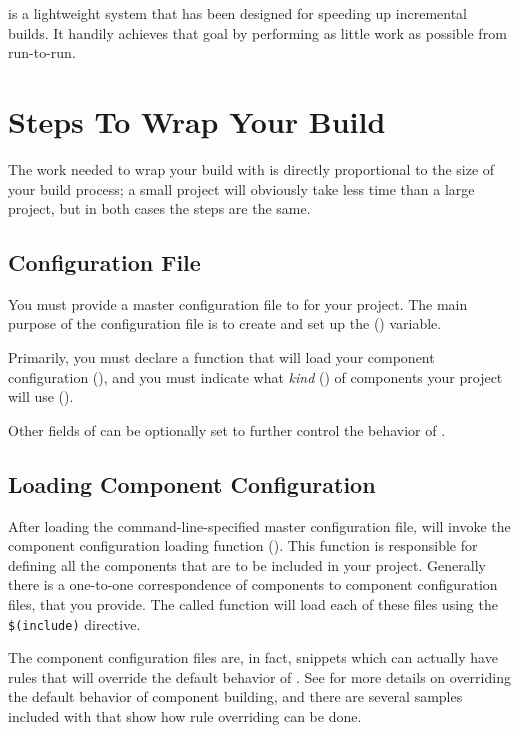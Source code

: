 \lmsbw is a lightweight system that has been designed for speeding up
incremental builds.  It handily achieves that goal by performing as
little work as possible from run-to-run.

\section{Steps To Wrap Your Build}

The work needed to wrap your build with \lmsbw is directly
proportional to the size of your build process; a small project will
obviously take less time than a large project, but in both cases the
steps are the same.

\subsection{Configuration File}

You must provide a master configuration file to \lmsbw for your
project.  The main purpose of the configuration file is to create and
set up the \lmsbwconfiguration ()
variable.

Primarily, you must declare a \gnumake function that will load your
component configuration
(), and you must indicate
what \emph{kind} () of components your project
will use ().

Other fields of \lmsbwconfiguration can be optionally set to further
control the behavior of \lmsbw.

\subsection{Loading Component Configuration}

After loading the command-line-specified master configuration file,
\lmsbw will invoke the component configuration loading function
().  This function is responsible
for defining all the components that are to be included in your
project.  Generally there is a one-to-one correspondence of components
to component configuration files, that you provide.  The called
function will load each of these files using the \gnumake
\texttt{\$(include)} directive.

The component configuration files are, in fact, \makefile snippets
which can actually have rules that will override the default behavior
of \lmsbw.  See  for more details on overriding
the default behavior of component building, and there are several
samples included with \lmsbw that show how rule overriding can be
done.

